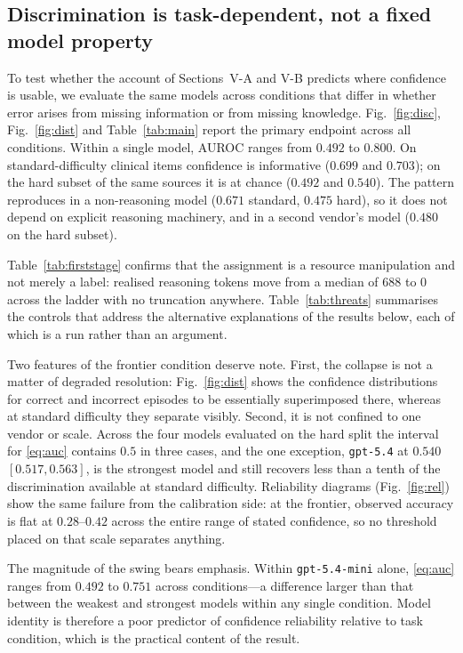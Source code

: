 \documentclass[journal,twoside]{IEEEtran}
\begin{document}
\subsection{Discrimination is task-dependent, not a fixed model property}
To test whether the account of Sections~V-A and V-B predicts where confidence is usable, we evaluate
the same models across conditions that differ in whether error arises from missing information or
from missing knowledge.
Fig.~\ref{fig:disc}, Fig.~\ref{fig:dist} and Table~\ref{tab:main} report the primary endpoint across all conditions. Within a single model,
AUROC ranges from $0.492$ to $0.800$. On standard-difficulty clinical items confidence is
informative ($0.699$ and $0.703$); on the hard subset of the same sources it is at chance
($0.492$ and $0.540$). The pattern reproduces in a non-reasoning model ($0.671$ standard,
$0.475$ hard), so it does not depend on explicit reasoning machinery, and in a second vendor's model
($0.480$ on the hard subset).

Table~\ref{tab:firststage} confirms that the assignment is a resource manipulation and not merely a
label: realised reasoning tokens move from a median of $688$ to $0$ across the ladder with no
truncation anywhere. Table~\ref{tab:threats} summarises the controls that address the alternative
explanations of the results below, each of which is a run rather than an argument.

Two features of the frontier condition deserve note. First, the collapse is not a matter of degraded
resolution: Fig.~\ref{fig:dist} shows the confidence distributions for correct and incorrect episodes
to be essentially superimposed there, whereas at standard difficulty they separate visibly. Second,
it is not confined to one vendor or scale. Across the four models evaluated on the hard split the
interval for \eqref{eq:auc} contains $0.5$ in three cases, and the one exception, \texttt{gpt-5.4} at
$0.540$ $[0.517,0.563]$, is the strongest model and still recovers less than a tenth of the
discrimination available at standard difficulty. Reliability diagrams (Fig.~\ref{fig:rel}) show the
same failure from the calibration side: at the frontier, observed accuracy is flat at $0.28$--$0.42$
across the entire range of stated confidence, so no threshold placed on that scale separates
anything.

The magnitude of the swing bears emphasis. Within \texttt{gpt-5.4-mini} alone, \eqref{eq:auc} ranges
from $0.492$ to $0.751$ across conditions---a difference larger than that between the weakest and
strongest models within any single condition. Model identity is therefore a poor predictor of
confidence reliability relative to task condition, which is the practical content of the result.
\end{document}
